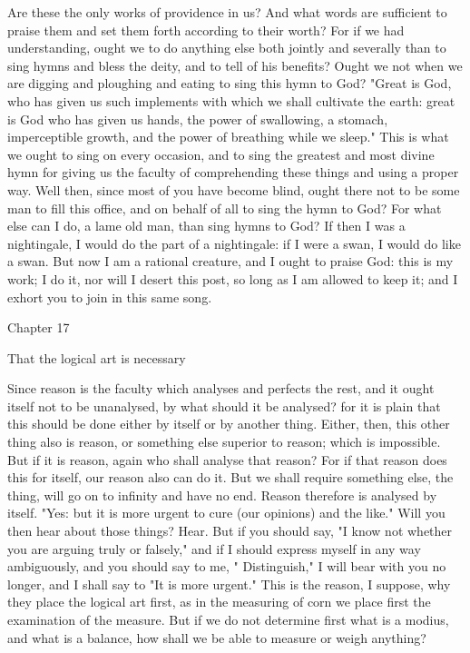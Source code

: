 \documentclass[a4paper]{article}
\begin{document}
Are these the only works of providence in us? And what words are sufficient
to praise them and set them forth according to their worth? For if
we had understanding, ought we to do anything else both jointly and
severally than to sing hymns and bless the deity, and to tell of his
benefits? Ought we not when we are digging and ploughing and eating
to sing this hymn to God? "Great is God, who has given us such implements
with which we shall cultivate the earth: great is God who has given
us hands, the power of swallowing, a stomach, imperceptible growth,
and the power of breathing while we sleep." This is what we ought
to sing on every occasion, and to sing the greatest and most divine
hymn for giving us the faculty of comprehending these things and using
a proper way. Well then, since most of you have become blind, ought
there not to be some man to fill this office, and on behalf of all
to sing the hymn to God? For what else can I do, a lame old man, than
sing hymns to God? If then I was a nightingale, I would do the part
of a nightingale: if I were a swan, I would do like a swan. But now
I am a rational creature, and I ought to praise God: this is my work;
I do it, nor will I desert this post, so long as I am allowed to keep
it; and I exhort you to join in this same song. 

Chapter 17

That the logical art is necessary 

Since reason is the faculty which analyses and perfects the rest,
and it ought itself not to be unanalysed, by what should it be analysed?
for it is plain that this should be done either by itself or by another
thing. Either, then, this other thing also is reason, or something
else superior to reason; which is impossible. But if it is reason,
again who shall analyse that reason? For if that reason does this
for itself, our reason also can do it. But we shall require something
else, the thing, will go on to infinity and have no end. Reason therefore
is analysed by itself. "Yes: but it is more urgent to cure (our opinions)
and the like." Will you then hear about those things? Hear. But if
you should say, "I know not whether you are arguing truly or falsely,"
and if I should express myself in any way ambiguously, and you should
say to me, " Distinguish," I will bear with you no longer, and I shall
say to "It is more urgent." This is the reason, I suppose, why they
place the logical art first, as in the measuring of corn we place
first the examination of the measure. But if we do not determine first
what is a modius, and what is a balance, how shall we be able to measure
or weigh anything? 
\end{document}
